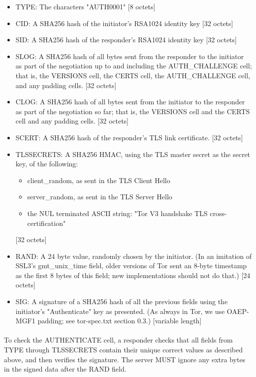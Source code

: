 \begin{itemize}
    \item TYPE: The characters "AUTH0001" [8 octets]
    \item CID: A SHA256 hash of the initiator's RSA1024 identity key [32 octets]
    \item SID: A SHA256 hash of the responder's RSA1024 identity key [32 octets]
    \item SLOG: A SHA256 hash of all bytes sent from the responder to the
    initiator as part of the negotiation up to and including the
    AUTH\_CHALLENGE cell; that is, the VERSIONS cell, the CERTS cell,
    the AUTH\_CHALLENGE cell, and any padding cells. [32 octets]
    \item CLOG: A SHA256 hash of all bytes sent from the initiator to the
    responder as part of the negotiation so far; that is, the
    VERSIONS cell and the CERTS cell and any padding cells. [32
    octets]
    \item SCERT: A SHA256 hash of the responder's TLS link certificate. [32
    octets]
    \item TLSSECRETS: A SHA256 HMAC, using the TLS master secret as the
    secret key, of the following:
    \begin{itemize}
        \item client\_random, as sent in the TLS Client Hello
        \item server\_random, as sent in the TLS Server Hello
        \item the NUL terminated ASCII string:
        \newline
        "Tor V3 handshake TLS cross-certification"
    \end{itemize} [32 octets]
    \item RAND: A 24 byte value, randomly chosen by the initiator. (In an
    imitation of SSL3's gmt\_unix\_time field, older versions of Tor
    sent an 8-byte timestamp as the first 8 bytes of this field;
    new implementations should not do that.) [24 octets]
    \item SIG: A signature of a SHA256 hash of all the previous fields
    using the initiator's "Authenticate" key as presented. (As
    always in Tor, we use OAEP-MGF1 padding; see tor-spec.txt
    section 0.3.)
    [variable length]
\end{itemize}

\paragraph{}
To check the AUTHENTICATE cell, a responder checks that all fields
from TYPE through TLSSECRETS contain their unique
correct values as described above, and then verifies the signature.
The server MUST ignore any extra bytes in the signed data after
the RAND field.

